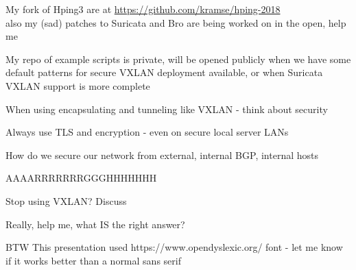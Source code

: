 \documentclass[Screen16to9,17pt,footrule]{foils}
\begin{document}
My fork of Hping3 are at \url{https://github.com/kramse/hping-2018}\\
also my (sad) patches to Suricata and Bro are being worked on in the open, help me

My repo of example scripts is private, will be opened publicly when we have some default patterns for secure VXLAN deployment available, or when Suricata VXLAN support is more complete



\begin{list2}
\item When using encapsulating and tunneling like VXLAN - think about security
\item Always use TLS and encryption - even on secure local server LANs
\item How do we secure our network from external, internal BGP, internal hosts
\item AAAARRRRRRRGGGHHHHHHH \smiley
\item Stop using VXLAN? Discuss
\end{list2}

\vskip 2cm
Really, help me, what IS the right answer? \smiley

\vskip 2cm
BTW This presentation used https://www.opendyslexic.org/ font - let me know if it works better than a normal sans serif
\end{document}
